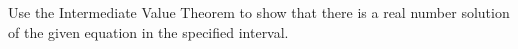 Use the Intermediate Value Theorem to show that there is a real number solution of the given equation in the specified interval. 
